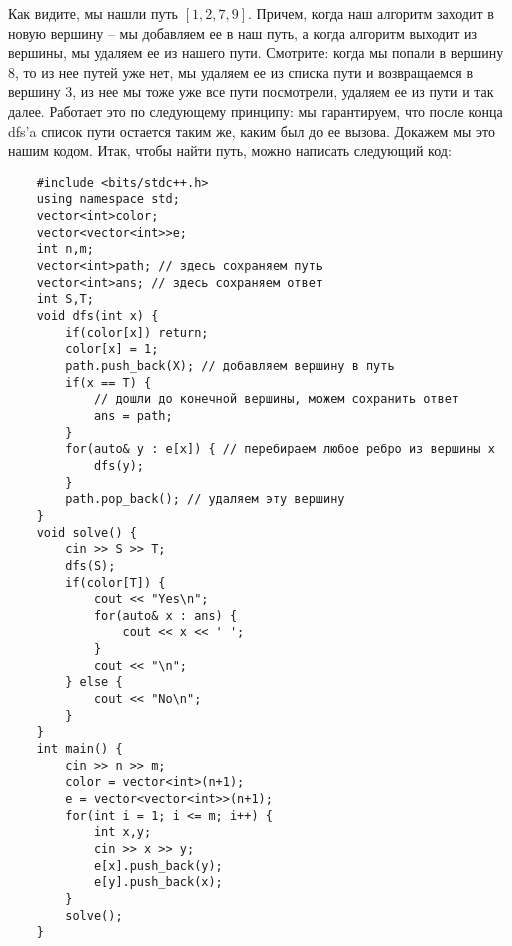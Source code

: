 \documentclass{article}
\begin{document}
\qquad {}  

Как видите, мы нашли путь $[1,2,7,9]$. Причем, когда наш алгоритм заходит в новую вершину -- мы добавляем ее в наш путь, а когда алгоритм выходит из вершины, мы удаляем ее из нашего пути. Смотрите: когда мы попали в вершину $8$, то из нее путей уже нет, мы удаляем ее из списка пути и возвращаемся в вершину $3$, из нее мы тоже уже все пути посмотрели, удаляем ее из пути и так далее. Работает это по следующему принципу: мы гарантируем, что после конца dfs'a список пути остается таким же, каким был до ее вызова. Докажем мы это нашим кодом. Итак, чтобы найти путь, можно написать следующий код: 

\begin{verbatim}
    #include <bits/stdc++.h>
    using namespace std;
    vector<int>color; 
    vector<vector<int>>e;
    int n,m;
    vector<int>path; // здесь сохраняем путь
    vector<int>ans; // здесь сохраняем ответ
    int S,T;
    void dfs(int x) {
        if(color[x]) return;
        color[x] = 1;
        path.push_back(X); // добавляем вершину в путь
        if(x == T) {
            // дошли до конечной вершины, можем сохранить ответ
            ans = path;
        }
        for(auto& y : e[x]) { // перебираем любое ребро из вершины x
            dfs(y);
        }
        path.pop_back(); // удаляем эту вершину
    }
    void solve() {
        cin >> S >> T;
        dfs(S);
        if(color[T]) {
            cout << "Yes\n";
            for(auto& x : ans) {
                cout << x << ' ';
            }
            cout << "\n";
        } else {
            cout << "No\n";
        }
    }
    int main() {
        cin >> n >> m;
        color = vector<int>(n+1);
        e = vector<vector<int>>(n+1);
        for(int i = 1; i <= m; i++) {
            int x,y;
            cin >> x >> y;
            e[x].push_back(y);
            e[y].push_back(x);
        }
        solve();
    }
\end{verbatim}
\end{document}
